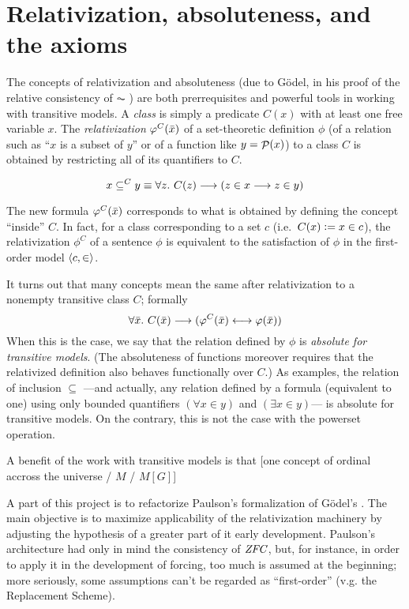 \section{Relativization,  absoluteness, and the axioms}
\label{sec:relat-absol}

The concepts of relativization and absoluteness (due to Gödel, in his
proof of the relative consistency of $\AC$ \cite{godel-L}) 
are both
prerrequisites and powerful tools in working with transitive
models. A \emph{class} is simply a predicate $C(x)$ with at least one
free variable $x$.
The \emph{relativization} $\phi^C(\bx)$ of a set-theoretic
definition
$\phi$ (of a relation such
as ``$x$ is a subset of $y$'' or of a function like $y=\P(x)$) to
a class $C$ is obtained by restricting all of its quantifiers to $C$.

\[
x \sbq^C y \equiv \forall z.\ C(z) \longrightarrow (z\in x
\longrightarrow z\in y)
\]

The new formula $\phi^C(\bx)$ corresponds to what is obtained by defining
the concept ``inside'' $C$. In fact, for a class corresponding to a
set $c$ (i.e.\ $C(x) \defi x \in c$), the relativization $\phi^C$ of a 
sentence $\phi$ is equivalent to the satisfaction of $\phi$ in the
first-order model $\lb c, \in\rb$.

It turns out that many concepts mean the
same after relativization to a nonempty transitive class $C$; formally
\[
\forall\bx.\ C(\bx) \longrightarrow (\phi^C(\bx) \longleftrightarrow
\phi(\bx))
\]
When this is the case, we say that the relation defined by $\phi$ is
\emph{absolute for transitive models}. (The absoluteness of functions
moreover requires that
the relativized definition also behaves functionally over $C$.) As
examples, the relation of inclusion $\subseteq$ ---and actually, any
relation defined by a formula (equivalent to one) using only bounded
quantifiers 
$(\forall x\in y)$ and $(\exists x\in y)$--- is absolute for
transitive models. On the contrary, this is not the case with the powerset
operation.

A benefit of the work with transitive models is that [one concept of
  ordinal accross the universe / $M$ / $M[G]$]

A part of this project is to refactorize Paulson's formalization
\cite{paulson_2003} of Gödel's \cite{godel-L}. The main objective is
to maximize applicability of the relativization machinery by adjusting
the hypothesis of a greater part of it early development. Paulson's
architecture had only in mind the consistency of $\ZFC$, but, for
instance, in order to apply it in the development of forcing, too much
is assumed at the beginning; more seriously, some assumptions can't be
regarded as ``first-order'' (v.g. the Replacement Scheme).

